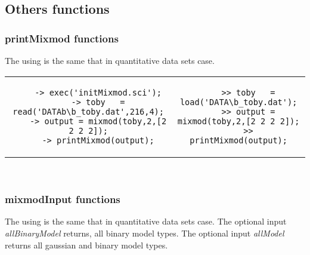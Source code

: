 \subsection{Others functions}

\subsubsection{{\sc printMixmod} functions}
The using is the same that in quantitative data sets case.\\


\begin{tabular}{c|c}
\begin{minipage}[c]{0.47\columnwidth}%
{\scriptsize
\begin{verbatim}
    -> exec('initMixmod.sci');
    -> toby   = read('DATAb\b_toby.dat',216,4);
    -> output = mixmod(toby,2,[2 2 2 2]);
    -> printMixmod(output);
\end{verbatim}}
\end{minipage}%
&
\begin{minipage}[c]{0.53\columnwidth}%
{\scriptsize
\begin{verbatim}
    >> toby   = load('DATA\b_toby.dat');
    >> output = mixmod(toby,2,[2 2 2 2]);
    >> printMixmod(output);
\end{verbatim}}
\end{minipage}%
\end{tabular}\\

\subsubsection{{\sc mixmodInput} functions}
The using is the same that in quantitative data sets case. The
optional input {\em  allBinaryModel} returns, all binary model
types. The optional input {\em allModel} returns all gaussian and
binary model types.\\


